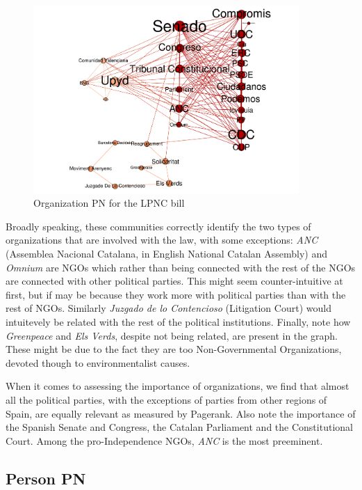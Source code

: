 \begin{figure}[H]
    \centering
    \includegraphics[width=0.9\textwidth]{figs/00102014-organizations}
    \caption{Organization PN for the LPNC bill}
    \label{fig:00102014-organizations}
\end{figure}


Broadly speaking, these communities correctly identify the two types of organizations that are involved with the law, with some exceptions: \emph{ANC} (Assemblea Nacional Catalana, in English National Catalan Assembly) and \emph{Omnium} are NGOs which rather than being connected with the rest of the NGOs are connected with other political parties. This might seem counter-intuitive at first, but if may be because they work more with political parties than with the rest of NGOs. Similarly \emph{Juzgado de lo Contencioso} (Litigation Court) would intuitevely be related with the rest of the political institutions. Finally, note how \emph{Greenpeace} and \emph{Els Verds}, despite not being related, are present in the graph. These might be due to the fact they are too Non-Governmental Organizations, devoted though to environmentalist causes. 

When it comes to assessing the importance of organizations, we find that almost all the political parties, with the exceptions of parties from other regions of Spain, are equally relevant as measured by Pagerank. Also note the importance of the Spanish Senate and Congress, the Catalan Parliament and the Constitutional Court. Among the pro-Independence NGOs, \emph{ANC} is the most preeminent.

\subsection{Person PN}\label{subsec:lpnc-person-organization}

